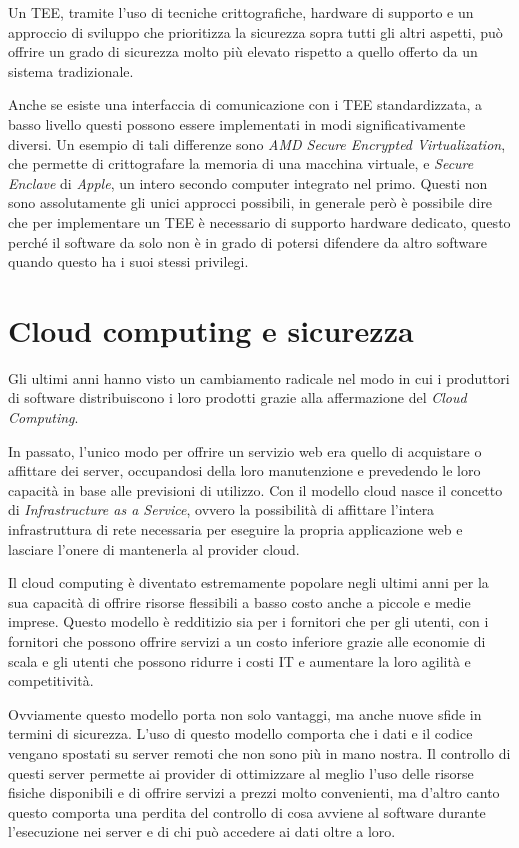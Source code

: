 \documentclass[12pt,italian]{report}
\begin{document}
Un TEE, tramite l'uso di tecniche crittografiche, hardware di supporto
e un approccio di sviluppo che prioritizza la sicurezza sopra tutti
gli altri aspetti, può offrire un grado di sicurezza molto più elevato
rispetto a quello offerto da un sistema tradizionale.

Anche se esiste una interfaccia di comunicazione con i TEE standardizzata,
a basso livello questi possono essere implementati in modi
significativamente diversi.
Un esempio di tali differenze sono
\textit{AMD Secure Encrypted Virtualization}, che permette di crittografare
la memoria di una macchina virtuale, e \textit{Secure Enclave}
di \textit{Apple}, un intero secondo computer integrato nel primo.
Questi non sono assolutamente gli unici approcci possibili,
in generale però è possibile dire che per implementare un TEE è necessario
di supporto hardware dedicato, questo perché il software da solo non è in
grado di potersi difendere da altro software quando questo ha i suoi
stessi privilegi.

\section{Cloud computing e sicurezza}
\label{sec:cloud}
Gli ultimi anni hanno visto un cambiamento radicale nel modo in cui
i produttori di software distribuiscono i loro prodotti
grazie alla affermazione del \textit{Cloud Computing}.

In passato, l'unico modo per offrire un servizio web era quello di
acquistare o affittare dei server, occupandosi della loro manutenzione
e prevedendo le loro capacità in base alle previsioni di
utilizzo.
Con il modello cloud nasce il concetto di
\textit{Infrastructure as a Service}, ovvero la possibilità di affittare
l'intera infrastruttura di rete necessaria per eseguire la propria applicazione
web e lasciare l'onere di mantenerla al provider cloud.

Il cloud computing è diventato estremamente popolare negli ultimi anni
per la sua capacità di offrire risorse flessibili a basso costo
anche a piccole e medie imprese.
Questo modello è redditizio sia per i fornitori che per gli utenti,
con i fornitori che possono offrire servizi a un costo inferiore grazie
alle economie di scala e gli utenti che possono ridurre i costi IT e
aumentare la loro agilità e competitività.

\bigbreak \noindent

Ovviamente questo modello porta non solo vantaggi, ma anche nuove sfide
in termini di sicurezza.
L'uso di questo modello comporta che i dati e il codice vengano spostati
su server remoti che non sono più in mano nostra.
Il controllo di questi server permette ai provider di ottimizzare al meglio
l'uso delle risorse fisiche disponibili e di offrire servizi a prezzi molto
convenienti, ma d'altro canto questo comporta una perdita del controllo
di cosa avviene al software durante l'esecuzione nei server e di 
chi può accedere ai dati oltre a loro.
\end{document}
